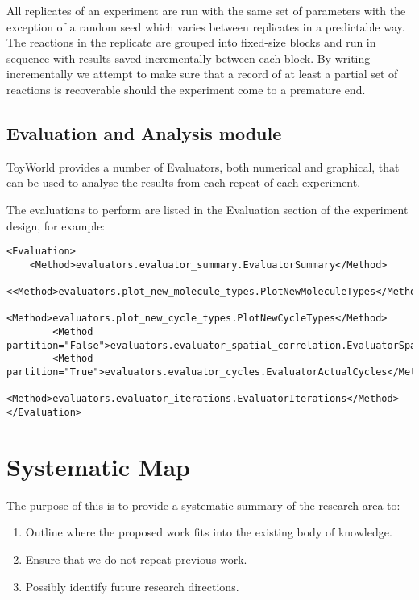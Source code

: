 All replicates of an experiment are run with the same set of parameters
with the exception of a random seed which varies between replicates in a
predictable way. The reactions in the replicate are grouped into
fixed-size blocks and run in sequence with results saved incrementally
between each block. By writing incrementally we attempt to make sure
that a record of at least a partial set of reactions is recoverable
should the experiment come to a premature end.

\section{Evaluation and Analysis module}\label{evaluation-and-analysis-module}

ToyWorld provides a number of Evaluators, both numerical and graphical,
that can be used to analyse the results from each repeat of each
experiment.

The evaluations to perform are listed in the Evaluation section of the
experiment design, for example:

\begin{verbatim}
<Evaluation>
    <Method>evaluators.evaluator_summary.EvaluatorSummary</Method>
        <<Method>evaluators.plot_new_molecule_types.PlotNewMoleculeTypes</Method>
        <Method>evaluators.plot_new_cycle_types.PlotNewCycleTypes</Method>
        <Method partition="False">evaluators.evaluator_spatial_correlation.EvaluatorSpatialCorrelation</Method>
        <Method partition="True">evaluators.evaluator_cycles.EvaluatorActualCycles</Method>
        <Method>evaluators.evaluator_iterations.EvaluatorIterations</Method>
</Evaluation>
\end{verbatim}

\chapter{Systematic Map}\label{systematic-map}

The purpose of this  is to provide a systematic summary of the research area to:

\begin{enumerate}
	\item Outline where the proposed work fits into the existing body of knowledge.
	\item Ensure that we do not repeat previous work.
	\item Possibly identify future research directions.
\end{enumerate}

